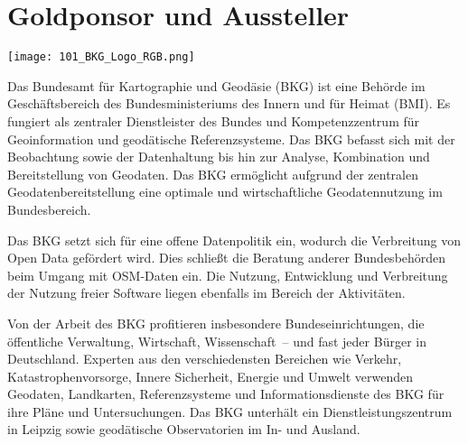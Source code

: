 \section*{Goldponsor und Aussteller}

\centerline{\texttt{[image: 101\_BKG\_Logo\_RGB.png]}}

Das Bundesamt für Kartographie und Geodäsie (BKG) ist eine Behörde im Geschäftsbereich des Bundesministeriums des Innern und für Heimat (BMI). Es fungiert als zentraler Dienstleister des Bundes und Kompetenzzentrum für Geoinformation und geodätische Referenzsysteme. Das BKG befasst sich mit der Beobachtung sowie der Datenhaltung bis hin zur Analyse, Kombination und Bereitstellung von Geodaten. Das BKG ermöglicht aufgrund der zentralen Geodatenbereitstellung eine optimale und wirtschaftliche Geodatennutzung im Bundesbereich.

Das BKG setzt sich für eine offene Datenpolitik ein, wodurch die Verbreitung von Open Data gefördert wird. Dies schließt die Beratung anderer Bundesbehörden beim Umgang mit OSM-Daten ein. Die Nutzung, Entwicklung und Verbreitung der Nutzung freier Software liegen ebenfalls im Bereich der Aktivitäten.

Von der Arbeit des BKG profitieren insbesondere Bundeseinrichtungen, die öffentliche Verwaltung, Wirtschaft, Wissenschaft~-- und fast jeder Bürger in Deutschland. Experten aus den verschiedensten Bereichen wie Verkehr, Katastrophenvorsorge, Innere Sicherheit, Energie und Umwelt verwenden Geodaten, Landkarten, Referenzsysteme und Informationsdienste des BKG für ihre Pläne und Untersuchungen. Das BKG unterhält ein Dienstleistungszentrum in Leipzig sowie geodätische Observatorien im In- und Ausland.
